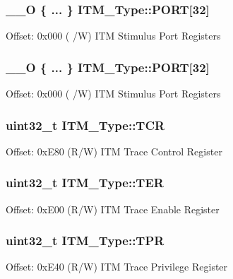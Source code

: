 \subsubsection[{\texorpdfstring{P\+O\+RT}{PORT}}]{\setlength{\rightskip}{0pt plus 5cm}\+\_\+\+\_\+O \{ ... \}    I\+T\+M\+\_\+\+Type\+::\+P\+O\+RT\mbox{[}32\mbox{]}}\hypertarget{structITM__Type_a4efd85680da427c5bf1dbd874c7a15a0}{}\label{structITM__Type_a4efd85680da427c5bf1dbd874c7a15a0}
Offset\+: 0x000 ( /W) I\+TM Stimulus Port Registers 
\subsubsection[{\texorpdfstring{P\+O\+RT}{PORT}}]{\setlength{\rightskip}{0pt plus 5cm}\+\_\+\+\_\+O \{ ... \}    I\+T\+M\+\_\+\+Type\+::\+P\+O\+RT\mbox{[}32\mbox{]}}\hypertarget{structITM__Type_a2f66f493e5e7f64e1687c6ba1887c4b5}{}\label{structITM__Type_a2f66f493e5e7f64e1687c6ba1887c4b5}
Offset\+: 0x000 ( /W) I\+TM Stimulus Port Registers 
\subsubsection[{\texorpdfstring{T\+CR}{TCR}}]{ uint32\+\_\+t I\+T\+M\+\_\+\+Type\+::\+T\+CR}\hypertarget{structITM__Type_a58f169e1aa40a9b8afb6296677c3bb45}{}\label{structITM__Type_a58f169e1aa40a9b8afb6296677c3bb45}
Offset\+: 0x\+E80 (R/W) I\+TM Trace Control Register 
\subsubsection[{\texorpdfstring{T\+ER}{TER}}]{ uint32\+\_\+t I\+T\+M\+\_\+\+Type\+::\+T\+ER}\hypertarget{structITM__Type_a91a040e1b162e1128ac1e852b4a0e589}{}\label{structITM__Type_a91a040e1b162e1128ac1e852b4a0e589}
Offset\+: 0x\+E00 (R/W) I\+TM Trace Enable Register 
\subsubsection[{\texorpdfstring{T\+PR}{TPR}}]{ uint32\+\_\+t I\+T\+M\+\_\+\+Type\+::\+T\+PR}\hypertarget{structITM__Type_a93b480aac6da620bbb611212186d47fa}{}\label{structITM__Type_a93b480aac6da620bbb611212186d47fa}
Offset\+: 0x\+E40 (R/W) I\+TM Trace Privilege Register 
